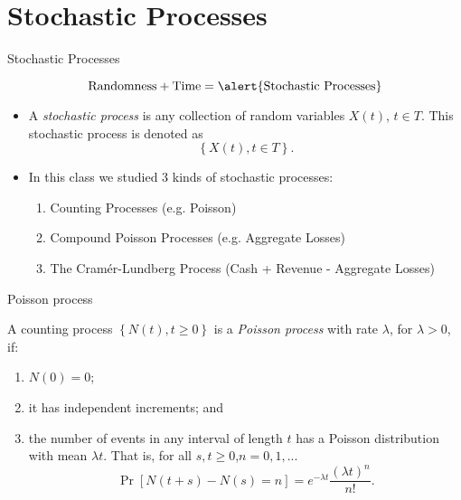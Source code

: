 \documentclass[11pt]{beamer}
\begin{document}
\section{Stochastic Processes}
\begin{frame}{Stochastic Processes}

\begin{mdframed}
\vspace{-0.6 cm}
\begin{center}
$$\text{Randomness} + \text{Time} = \alert{\text{Stochastic Processes}}$$
\end{center}

\end{mdframed}

\begin{itemize}

\item A \alert{\textit{stochastic process}} is any collection of
random variables $X\left( t\right) $, $t\in T$. This stochastic process is denoted as
\begin{equation*}
\left\{ X\left( t\right) ,t\in T\right\} .
\end{equation*}

\item In this class we studied 3 kinds of stochastic processes:

\begin{enumerate}
\item Counting Processes (e.g. Poisson)

\item Compound Poisson Processes (e.g. Aggregate Losses)

\item The Cram\'er-Lundberg Process (Cash + Revenue - Aggregate Losses)
\end{enumerate}

\end{itemize}

\end{frame}
\begin{frame}{Poisson process}

A counting process $\left\{ N\left( t\right) ,t\geq 0\right\} $ is
a \alert{\textit{Poisson process}} with rate $\lambda $, for $\lambda >0$, if:

\begin{enumerate}
\item $N\left( 0\right) =0$;

\item it has independent increments; and

\item the number of events in any interval of length $t$ has a Poisson
distribution with mean $\lambda t$. That is, for all $s,t\geq 0$,$n=0,1,...$%
\begin{equation*}
\text{$\Pr $}\left[ N\left( t+s\right) -N\left( s\right) =n\right]
=e^{-\lambda t}\frac{\left( \lambda t\right) ^{n}}{n!}.
\end{equation*}%
\newpage
\end{enumerate}

\end{frame}
\end{document}
